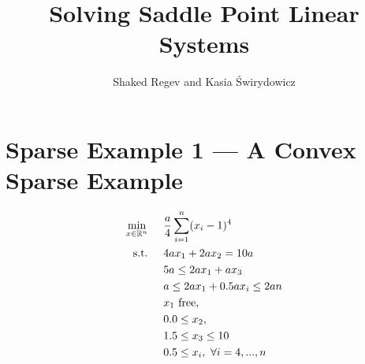 \documentclass[11pt,letterpaper]{article}
\title{$ $
\\[-100pt] Solving Saddle Point Linear Systems}
\author{Shaked Regev and Kasia \'{S}wirydowicz}
\begin{document}

\section{Sparse Example 1 --- A Convex Sparse Example}
\begin{align}
&&&&\min_{x\in\mathbb{R}^n} & \hspace{0.5cm} \frac{a}{4}\sum_{i=1}^{n} (x_i-1)^4 &&&& \label{ex6:obj}\\
&&&&\textnormal{s.t.} &\hspace{0.5cm}  4ax_1+2ax_2 = 10a &&&& \label{ex6:eq1}\\
&&&&& \hspace{0.5cm} 5a \leq  2ax_1 + ax_3                 &&&& \label{ex6:ineq1}\\
&&&&& \hspace{0.5cm}  a \leq  2ax_1       + 0.5ax_i \leq 2an &&&& \label{ex6:ineq2}\\
&&&&& \hspace{0.5cm}  x_1~\textnormal{free}, &&&& \label{ex6:varb1}\\
&&&&& \hspace{0.5cm}  0.0 \leq x_2, &&&& \label{ex6:varb2}\\
&&&&& \hspace{0.5cm}  1.5 \leq x_3 \leq 10  &&&& \label{ex6:varb3}\\
&&&&& \hspace{0.5cm}  0.5 \leq x_i, \ \forall i=4,...,n               &&& \label{ex6:varb4}
\end{align}
\end{document}
